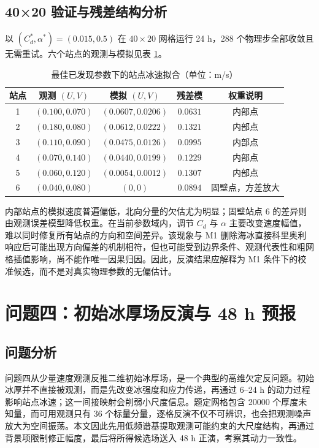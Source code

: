 \documentclass[UTF8]{ctexart}
\begin{document}
\subsection{40×20 验证与残差结构分析}

以 $(C_d^*,\alpha^*)=(0.015,0.5)$ 在 $40\times20$ 网格运行 24 h，288 个物理步全部收敛且无需重试。六个站点的观测与模拟见表 \ref{tab:p3_station}。

\begin{table}[H]
\centering
\caption{最佳已发现参数下的站点冰速拟合（单位：m/s）}
\renewcommand{\arraystretch}{1.3}
\begin{tabular*}{\textwidth}{@{\extracolsep{\fill}}ccccc@{}}
\toprule[1pt]
站点 & 观测 $(U,V)$ & 模拟 $(U,V)$ & 残差模 & 权重说明\\
\midrule
1 & $(0.100,0.070)$ & $(0.0607,0.0206)$ & $0.0631$ & 内部点\\
2 & $(0.180,0.080)$ & $(0.0612,0.0222)$ & $0.1321$ & 内部点\\
3 & $(0.110,0.090)$ & $(0.0475,0.0126)$ & $0.0995$ & 内部点\\
4 & $(0.070,0.140)$ & $(0.0440,0.0199)$ & $0.1229$ & 内部点\\
5 & $(0.060,0.120)$ & $(0.0054,0.0012)$ & $0.1307$ & 内部点\\
6 & $(0.040,0.080)$ & $(0,0)$ & $0.0894$ & 固壁点，方差放大\\
\bottomrule[1pt]
\end{tabular*}
\label{tab:p3_station}
\end{table}

内部站点的模拟速度普遍偏低，北向分量的欠估尤为明显；固壁站点 6 的差异则由观测误差模型降低权重。在当前参数域内，调节 $C_d$ 与 $\alpha$ 主要改变速度幅值，难以同时修复所有站点的方向和空间差异。该现象与 M1 删除海冰直接科里奥利响应后可能出现方向偏差的机制相符，但也可能受到边界条件、观测代表性和粗网格插值影响，尚不能作唯一因果归因。因此，反演结果应解释为 M1 条件下的校准候选，而不是对真实物理参数的无偏估计。

\section{问题四：初始冰厚场反演与 48 h 预报}

\subsection{问题分析}

问题四从少量速度观测反推二维初始冰厚场，是一个典型的高维欠定反问题。初始冰厚并不直接被观测，而是先改变冰强度和应力传递，再通过 6--24 h 的动力过程影响站点冰速；这一间接映射会削弱小尺度信息。题定网格包含 20000 个厚度未知量，而可用观测只有 36 个标量分量，逐格反演不仅不可辨识，也会把观测噪声放大为空间振荡。本文因此先用低频谱基提取观测可能约束的大尺度结构，再通过背景项限制修正幅度，最后将所得候选场送入 48 h 正演，考察其动力一致性。
\end{document}
